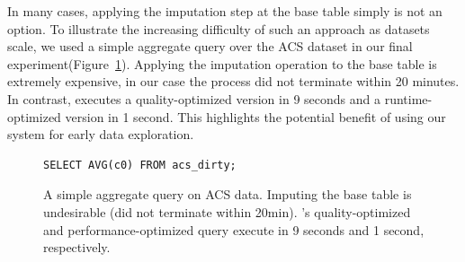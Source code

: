 In many cases, applying the imputation step at the base table simply is not an option. To illustrate the increasing difficulty of such an approach
as datasets scale, we used a simple aggregate query over the ACS dataset in our final experiment(Figure~\ref{query-acs}). Applying the imputation operation to the base table
is extremely expensive, in our case the process did not terminate within 20 minutes. In contrast, \ProjectName{} executes a quality-optimized version
in 9 seconds and a runtime-optimized version in 1 second. This highlights the potential benefit of using our system for early data exploration.

\begin{figure}
\begin{lstlisting}
SELECT AVG(c0) FROM acs_dirty;
\end{lstlisting}
\caption{A simple aggregate query on ACS data. Imputing the base table is undesirable (did not terminate within 20min). \ProjectName's
quality-optimized and performance-optimized query execute in 9 seconds and 1 second, respectively.
}
\label{query-acs}
\end{figure}


